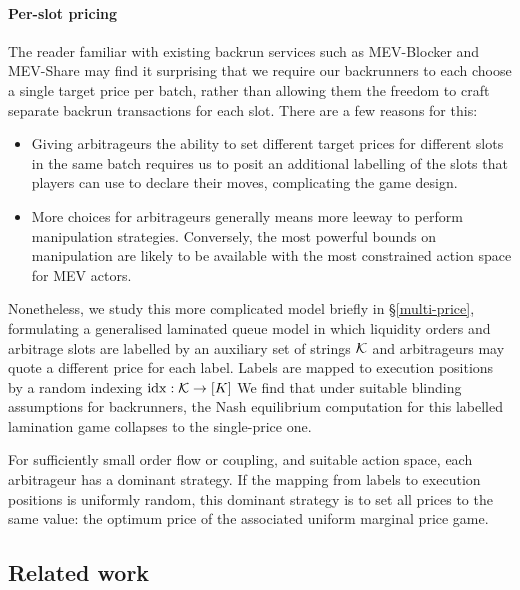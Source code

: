 \paragraph{Per-slot pricing}
%
The reader familiar with existing backrun services such as MEV-Blocker and MEV-Share may find it surprising that we require our backrunners to each choose a single target price per batch, rather than allowing them the freedom to craft separate backrun transactions for each slot.
%
There are a few reasons for this:
%
\begin{itemize}
  \item 
    Giving arbitrageurs the ability to set different target prices for different slots in the same batch requires us to posit an additional labelling of the slots that players can use to declare their moves, complicating the game design.
  \item
    More choices for arbitrageurs generally means more leeway to perform manipulation strategies.
    Conversely, the most powerful bounds on manipulation are likely to be available with the most constrained action space for MEV actors.
\end{itemize}

Nonetheless, we study this more complicated model briefly in \S\ref{multi-price}, formulating a generalised laminated queue model in which liquidity orders and arbitrage slots are labelled by an auxiliary set of strings $\mathcal{K}$ and arbitrageurs may quote a different price for each label.
%
Labels are mapped to execution positions by a random indexing $\mathrm{idx}:\mathcal{K}\rightarrow[K]$
%
We find that under suitable blinding assumptions for backrunners, the Nash equilibrium computation for this labelled lamination game collapses to the single-price one.

\begin{theorem}

  For sufficiently small order flow or coupling, and suitable action space, each arbitrageur has a dominant strategy.
  If the mapping from labels to execution positions is uniformly random, this dominant strategy is to set all prices to the same value: the optimum price of the associated uniform marginal price game.

\end{theorem}


\subsection{Related work}

